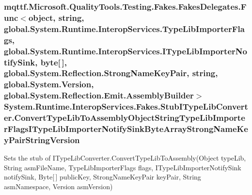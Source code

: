 \hypertarget{class_system_1_1_runtime_1_1_interop_services_1_1_fakes_1_1_stub_i_type_lib_converter_a1fc8bdc1965f71e6601b04ec0ce5a7fa}{
\subsubsection[{Convert\-Type\-Lib\-To\-Assembly\-Object\-String\-Type\-Lib\-Importer\-Flags\-I\-Type\-Lib\-Importer\-Notify\-Sink\-Byte\-Array\-Strong\-Name\-Key\-Pair\-String\-Version}]{\setlength{\rightskip}{0pt plus 5cm}mqttf.\-Microsoft.\-Quality\-Tools.\-Testing.\-Fakes.\-Fakes\-Delegates.\-Func$<$object, string, global.\-System.\-Runtime.\-Interop\-Services.\-Type\-Lib\-Importer\-Flags, global.\-System.\-Runtime.\-Interop\-Services.\-I\-Type\-Lib\-Importer\-Notify\-Sink, byte\mbox{[}$\,$\mbox{]}, global.\-System.\-Reflection.\-Strong\-Name\-Key\-Pair, string, global.\-System.\-Version, global.\-System.\-Reflection.\-Emit.\-Assembly\-Builder$>$ System.\-Runtime.\-Interop\-Services.\-Fakes.\-Stub\-I\-Type\-Lib\-Converter.\-Convert\-Type\-Lib\-To\-Assembly\-Object\-String\-Type\-Lib\-Importer\-Flags\-I\-Type\-Lib\-Importer\-Notify\-Sink\-Byte\-Array\-Strong\-Name\-Key\-Pair\-String\-Version}}\label{class_system_1_1_runtime_1_1_interop_services_1_1_fakes_1_1_stub_i_type_lib_converter_a1fc8bdc1965f71e6601b04ec0ce5a7fa}


Sets the stub of I\-Type\-Lib\-Converter.\-Convert\-Type\-Lib\-To\-Assembly(\-Object type\-Lib, String asm\-File\-Name, Type\-Lib\-Importer\-Flags flags, I\-Type\-Lib\-Importer\-Notify\-Sink notify\-Sink, Byte\mbox{[}$\,$\mbox{]} public\-Key, Strong\-Name\-Key\-Pair key\-Pair, String asm\-Namespace, Version asm\-Version)


